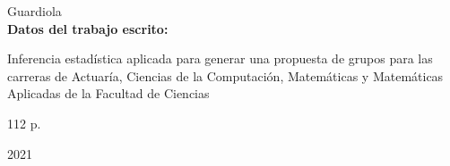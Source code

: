 {Guardiola\\

\textbf{Datos del trabajo escrito:}

Inferencia estadística aplicada para generar una propuesta de grupos para las carreras de Actuaría, Ciencias de la Computación, Matemáticas y Matemáticas Aplicadas de la Facultad de Ciencias

112 p.

2021
}%








%
 

\newpage %
\thispagestyle{empty} %

\tableofcontents %
\listoffigures %
\listoftables %

